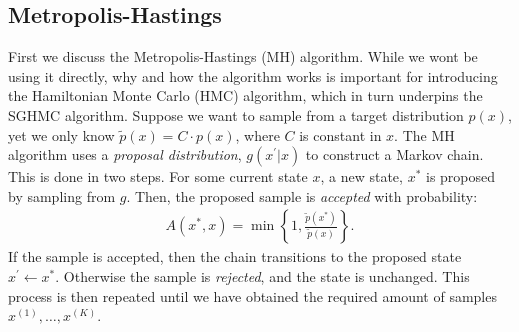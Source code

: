 \subsection{Metropolis-Hastings}
First we discuss the Metropolis-Hastings (MH) algorithm.
While we wont be using it directly, why and how the algorithm works is important for introducing the Hamiltonian Monte Carlo (HMC) algorithm, which in turn underpins the SGHMC algorithm.
Suppose we want to sample from a target distribution $p(x)$, yet we only know $\tilde{p}(x) = C \cdot p(x)$, where $C$ is constant in $x$.
The MH algorithm uses a \emph{proposal distribution}, $g(x^\prime|x)$ to construct a Markov chain.
This is done in two steps.
For some current state $x$, a new state, $x^\ast$ is proposed by sampling from $g$.
Then, the proposed sample is \emph{accepted} with probability:
\begin{align}
    A(x^{\ast}, x) = \min\left\{1, \frac{\tilde{p}(x^\ast)}{\tilde{p}(x)}\right\}.
\end{align}
If the sample is accepted, then the chain transitions to the proposed state $x^\prime \gets x^\ast$.
Otherwise the sample is \emph{rejected}, and the state is unchanged.
This process is then repeated until we have obtained the required amount of samples $x^{(1)},\dots,x^{(K)}$. 

